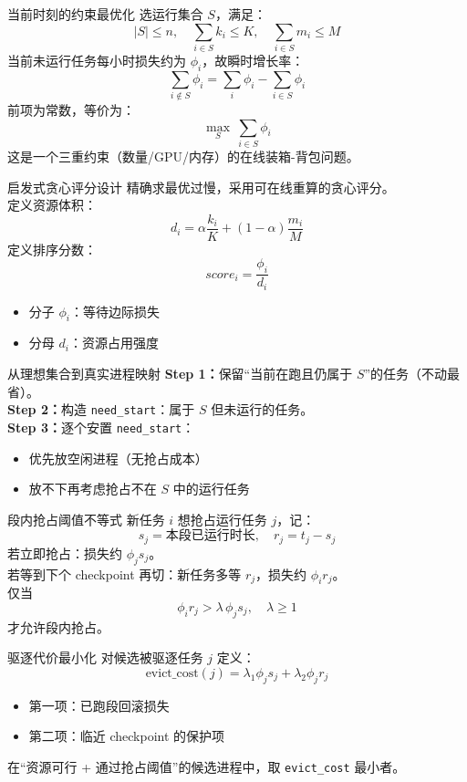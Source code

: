 \documentclass[10pt,aspectratio=169]{beamer}
\begin{document}
\begin{frame}{当前时刻的约束最优化}
选运行集合 $S$，满足：
\[
|S|\le n,\quad \sum_{i\in S}k_i\le K,\quad \sum_{i\in S}m_i\le M
\]
当前未运行任务每小时损失约为 $\phi_i$，故瞬时增长率：
\[
\sum_{i\notin S}\phi_i=\sum_i\phi_i-\sum_{i\in S}\phi_i
\]
前项为常数，等价为：
\[
\max_{S}\ \sum_{i\in S}\phi_i
\]
这是一个三重约束（数量/GPU/内存）的在线装箱-背包问题。
\end{frame}

\begin{frame}{启发式贪心评分设计}
精确求最优过慢，采用可在线重算的贪心评分。\\[-2pt]
定义资源体积：
\[
d_i=\alpha\frac{k_i}{K}+(1-\alpha)\frac{m_i}{M}
\]
定义排序分数：
\[
score_i=\frac{\phi_i}{d_i}
\]
\begin{itemize}
  \item 分子 $\phi_i$：等待边际损失
  \item 分母 $d_i$：资源占用强度
\end{itemize}
\end{frame}

\begin{frame}{从理想集合到真实进程映射}
\textbf{Step 1：}保留“当前在跑且仍属于 $S$”的任务（不动最省）。\\
\textbf{Step 2：}构造 \texttt{need\_start}：属于 $S$ 但未运行的任务。\\
\textbf{Step 3：}逐个安置 \texttt{need\_start}：
\begin{itemize}
  \item 优先放空闲进程（无抢占成本）
  \item 放不下再考虑抢占不在 $S$ 中的运行任务
\end{itemize}
\end{frame}

\begin{frame}{段内抢占阈值不等式}
新任务 $i$ 想抢占运行任务 $j$，记：
\[
s_j=\text{本段已运行时长},\quad r_j=t_j-s_j
\]
若立即抢占：损失约 $\phi_j s_j$。\\
若等到下个 checkpoint 再切：新任务多等 $r_j$，损失约 $\phi_i r_j$。\\[2pt]
仅当
\[
\phi_i r_j > \lambda\,\phi_j s_j,\quad \lambda\ge1
\]
才允许段内抢占。
\end{frame}

\begin{frame}{驱逐代价最小化}
对候选被驱逐任务 $j$ 定义：
\[
\text{evict\_cost}(j)=\lambda_1\phi_j s_j+\lambda_2\phi_j r_j
\]
\begin{itemize}
  \item 第一项：已跑段回滚损失
  \item 第二项：临近 checkpoint 的保护项
\end{itemize}
在“资源可行 + 通过抢占阈值”的候选进程中，取 \texttt{evict\_cost} 最小者。
\end{frame}
\end{document}
